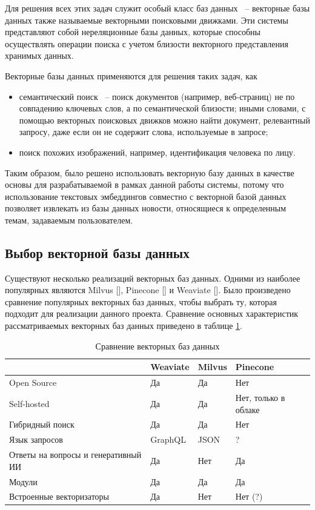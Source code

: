 Для решения всех этих задач служит особый класс баз данных ~-- векторные базы данных также называемые векторными поисковыми движками. Эти системы представляют собой нереляционные базы данных, которые способны осуществлять операции поиска с учетом близости векторного представления хранимых данных.

Векторные базы данных применяются для решения таких задач, как
\begin{itemize}
    \item семантический поиск ~-- поиск документов (например, веб-страниц) не по совпадению ключевых слов, а по семантической близости; иными словами, с помощью векторных поисковых движков можно найти документ, релевантный запросу, даже если он не содержит слова, используемые в запросе;
    \item поиск похожих изображений, например, идентификация человека по лицу.
\end{itemize}

Таким образом, было решено использовать векторную базу данных в качестве основы для разрабатываемой в рамках данной работы системы, потому что использование текстовых эмбеддингов совместно с векторной базой данных позволяет извлекать из базы данных новости, относящиеся к определенным темам, задаваемым пользователем.

\subsection{Выбор векторной базы данных}

Существуют несколько реализаций векторных баз данных. Одними из наиболее популярных являются Milvus [\cite{milvus}], Pinecone [\cite{pinecone}] и Weaviate [\cite{weaviate}]. Было произведено сравнение популярных векторных баз данных, чтобы выбрать ту, которая подходит для реализации данного проекта. Сравнение основных характеристик рассматриваемых векторных баз данных приведено в таблице \ref{tab:vector-db-compare}.

\begin{table}[ht]
    \caption{Сравнение векторных баз данных}
    \label{tab:vector-db-compare}
    \begin{tabularx}{\textwidth}{|l|X|X|X|}
        \hline
        & Weaviate & Milvus & Pinecone \\
        \hline
        Open Source & Да & Да & Нет \\
        \hline
        Self-hosted & Да & Да & Нет, только в облаке \\
        \hline
        Гибридный поиск & Да & Да & Нет \\
        \hline
        Язык запросов & GraphQL & JSON &  ? \\
        \hline
        Ответы на вопросы и генеративный ИИ & Да & Нет & Да \\
        \hline
        Модули & Да & Да & Да \\
        \hline
        Встроенные векторизаторы & Да & Нет & Нет (?) \\
        \hline
    \end{tabularx}
\end{table}

